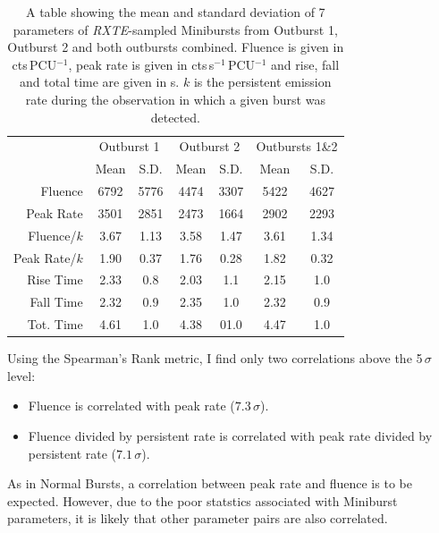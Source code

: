 \begin{table}
\centering
\begin{tabular}{r c c c c c c}
\hline
\hline
 & \multicolumn{2}{c}{\scriptsize Outburst 1} & \multicolumn{2}{c}{\scriptsize Outburst 2} & \multicolumn{2}{c}{\scriptsize Outbursts 1\&2}  \\
 &Mean&S.D.&Mean&S.D.&Mean&S.D.\\
\hline
\scriptsize Fluence&6792&5776&4474&3307&5422&4627\\
\scriptsize Peak Rate&3501&2851&2473&1664&2902&2293\\
\scriptsize Fluence/$k$&3.67&1.13&3.58&1.47&3.61&1.34\\
\scriptsize Peak Rate/$k$&1.90&0.37&1.76&0.28&1.82&0.32\\
\scriptsize Rise Time&2.33&0.8&2.03&1.1&2.15&1.0\\
\scriptsize Fall Time&2.32&0.9&2.35&1.0&2.32&0.9\\
\scriptsize Tot. Time&4.61&1.0&4.38&01.0&4.47&1.0\\
\hline
\hline
\end{tabular}
\caption[A table showing the mean and standard deviation of 7 parameters of \textit{RXTE}-sampled Minibursts from the 1996 outburst, the 1997 outburst and both outbursts combined.]{A table showing the mean and standard deviation of 7 parameters of \indexrxte\textit{RXTE}-sampled Minibursts from Outburst 1, Outburst 2 and both outbursts combined.  Fluence is given in cts\,PCU$^{-1}$, peak rate is given in cts\,s$^{-1}$\,PCU$^{-1}$ and rise, fall and total time are given in s.  $k$ is the persistent emission rate during the observation in which a given burst was detected.}
\label{tab:mini_param}
\end{table}

\par Using the Spearman's Rank metric, I find only two correlations above the 5$\,\sigma$ level:
\begin{itemize}
\item Fluence is correlated with peak rate ($7.3\,\sigma$).
\item Fluence divided by persistent rate is correlated with peak rate divided by persistent rate ($7.1\,\sigma$).
\end{itemize}
As in Normal Bursts, a correlation between peak rate and fluence is to be expected.  However, due to the poor statstics associated with Miniburst parameters, it is likely that other parameter pairs are also correlated.

